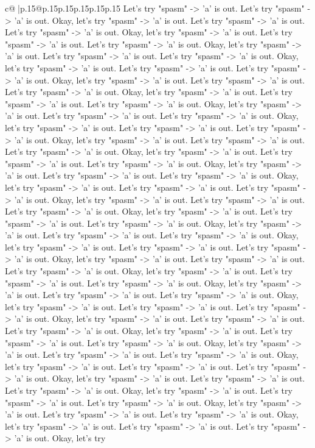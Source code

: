 \documentclass{article}
\begin{document}
{\begin{supertabular}{c@{$\;$}|p{.15\linewidth}@{}p{.15\linewidth}p{.15\linewidth}p{.15\linewidth}p{.15\linewidth}p{.15\linewidth}}
{{{Let's try "spasm" {-}> 'a' is out. Let's try "spasm" {-}> 'a' is out. Okay, let's try "spasm" {-}> 'a' is out. Let's try "spasm" {-}> 'a' is out. Let's try "spasm" {-}> 'a' is out. Okay, let's try "spasm" {-}> 'a' is out. Let's try "spasm" {-}> 'a' is out. Let's try "spasm" {-}> 'a' is out. Okay, let's try "spasm" {-}> 'a' is out. Let's try "spasm" {-}> 'a' is out. Let's try "spasm" {-}> 'a' is out. Okay, let's try "spasm" {-}> 'a' is out. Let's try "spasm" {-}> 'a' is out. Let's try "spasm" {-}> 'a' is out. Okay, let's try "spasm" {-}> 'a' is out. Let's try "spasm" {-}> 'a' is out. Let's try "spasm" {-}> 'a' is out. Okay, let's try "spasm" {-}> 'a' is out. Let's try "spasm" {-}> 'a' is out. Let's try "spasm" {-}> 'a' is out. Okay, let's try "spasm" {-}> 'a' is out. Let's try "spasm" {-}> 'a' is out. Let's try "spasm" {-}> 'a' is out. Okay, let's try "spasm" {-}> 'a' is out. Let's try "spasm" {-}> 'a' is out. Let's try "spasm" {-}> 'a' is out. Okay, let's try "spasm" {-}> 'a' is out. Let's try "spasm" {-}> 'a' is out. Let's try "spasm" {-}> 'a' is out. Okay, let's try "spasm" {-}> 'a' is out. Let's try "spasm" {-}> 'a' is out. Let's try "spasm" {-}> 'a' is out. Okay, let's try "spasm" {-}> 'a' is out. Let's try "spasm" {-}> 'a' is out. Let's try "spasm" {-}> 'a' is out. Okay, let's try "spasm" {-}> 'a' is out. Let's try "spasm" {-}> 'a' is out. Let's try "spasm" {-}> 'a' is out. Okay, let's try "spasm" {-}> 'a' is out. Let's try "spasm" {-}> 'a' is out. Let's try "spasm" {-}> 'a' is out. Okay, let's try "spasm" {-}> 'a' is out. Let's try "spasm" {-}> 'a' is out. Let's try "spasm" {-}> 'a' is out. Okay, let's try "spasm" {-}> 'a' is out. Let's try "spasm" {-}> 'a' is out. Let's try "spasm" {-}> 'a' is out. Okay, let's try "spasm" {-}> 'a' is out. Let's try "spasm" {-}> 'a' is out. Let's try "spasm" {-}> 'a' is out. Okay, let's try "spasm" {-}> 'a' is out. Let's try "spasm" {-}> 'a' is out. Let's try "spasm" {-}> 'a' is out. Okay, let's try "spasm" {-}> 'a' is out. Let's try "spasm" {-}> 'a' is out. Let's try "spasm" {-}> 'a' is out. Okay, let's try "spasm" {-}> 'a' is out. Let's try "spasm" {-}> 'a' is out. Let's try "spasm" {-}> 'a' is out. Okay, let's try "spasm" {-}> 'a' is out. Let's try "spasm" {-}> 'a' is out. Let's try "spasm" {-}> 'a' is out. Okay, let's try "spasm" {-}> 'a' is out. Let's try "spasm" {-}> 'a' is out. Let's try "spasm" {-}> 'a' is out. Okay, let's try "spasm" {-}> 'a' is out. Let's try "spasm" {-}> 'a' is out. Let's try "spasm" {-}> 'a' is out. Okay, let's try "spasm" {-}> 'a' is out. Let's try "spasm" {-}> 'a' is out. Let's try "spasm" {-}> 'a' is out. Okay, let's try "spasm" {-}> 'a' is out. Let's try "spasm" {-}> 'a' is out. Let's try "spasm" {-}> 'a' is out. Okay, let's try "spasm" {-}> 'a' is out. Let's try "spasm" {-}> 'a' is out. Let's try "spasm" {-}> 'a' is out. Okay, let's try "spasm" {-}> 'a' is out. Let's try "spasm" {-}> 'a' is out. Let's try "spasm" {-}> 'a' is out. Okay, let's try "spasm" {-}> 'a' is out. Let's try "spasm" {-}> 'a' is out. Let's try "spasm" {-}> 'a' is out. Okay, let's try "spasm" {-}> 'a' is out. Let's try "spasm" {-}> 'a' is out. Let's try "spasm" {-}> 'a' is out. Okay, let's try }}}
\end{supertabular}}
\end{document}
